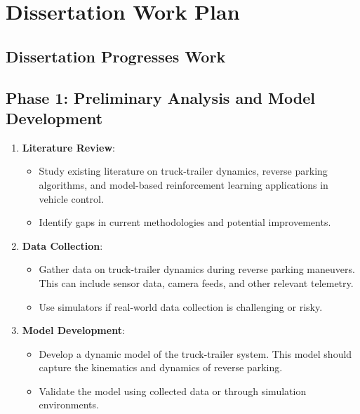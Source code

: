 \chapter{\leavevmode\newline Dissertation Work Plan }
\label{chap: Dissertation Work Plan}

\section{Dissertation Progresses Work}


\section*{Phase 1: Preliminary Analysis and Model Development }

\begin{enumerate}
    \item \textbf{Literature Review}:
    \begin{itemize}
        \item Study existing literature on truck-trailer dynamics, reverse parking algorithms, and model-based reinforcement learning applications in vehicle control.
        \item Identify gaps in current methodologies and potential improvements.
    \end{itemize}
    
    \item \textbf{Data Collection}:
    \begin{itemize}
        \item Gather data on truck-trailer dynamics during reverse parking maneuvers. This can include sensor data, camera feeds, and other relevant telemetry.
        \item Use simulators if real-world data collection is challenging or risky.
    \end{itemize}
    
    \item \textbf{Model Development}:
    \begin{itemize}
        \item Develop a dynamic model of the truck-trailer system. This model should capture the kinematics and dynamics of reverse parking.
        \item Validate the model using collected data or through simulation environments.
    \end{itemize}
\end{enumerate}

